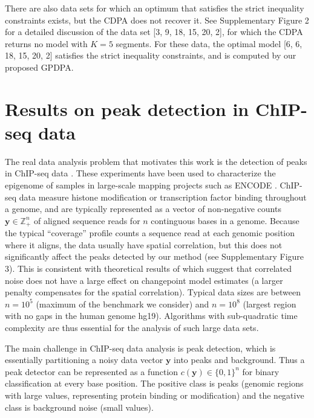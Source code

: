 \documentclass[twoside,11pt]{article}
\newcommand{\ZZ}{\mathbb Z}
\begin{document}
There are also data sets for which an optimum that satisfies the
strict inequality constraints exists, but the CDPA does not recover
it. See Supplementary Figure 2 for a detailed discussion of the data
set [3, 9, 18, 15, 20, 2], for which the CDPA returns no model with
$K=5$ segments. For these data, the optimal model [6, 6, 18, 15, 20,
2] satisfies the strict inequality constraints, and is computed by our
proposed GPDPA.

\section{Results on peak detection in ChIP-seq data}
\label{sec:results-chip-seq}
\label{sec:results}



The real data analysis problem that motivates this work is the
detection of peaks in ChIP-seq data \citep{practical}. These
experiments have been used to characterize the epigenome of samples in
large-scale mapping projects such as ENCODE \citep{ENCODE}. ChIP-seq
data measure histone modification or transcription factor binding
throughout a genome, and are typically represented as a vector of
non-negative counts $\mathbf y\in\ZZ_+^n$ of aligned sequence reads
for $n$ continguous bases in a genome. Because the typical
``coverage'' profile counts a sequence read at each genomic position
where it aligns, the data usually have spatial correlation, but this
does not significantly affect the peaks detected by our method (see
Supplementary Figure 3). This is consistent with theoretical results
of \citet{Lavielle-Moulines} which suggest that correlated noise does
not have a large effect on changepoint model estimates (a larger
penalty compensates for the spatial correlation). Typical data sizes are
between $n=10^5$ (maximum of the benchmark we consider) and $n=10^8$
(largest region with no gaps in the human genome hg19). Algorithms
with sub-quadratic time complexity are thus essential for the analysis
of such large data sets.

The main challenge in ChIP-seq data analysis is peak detection, which
is essentially partitioning a noisy data vector $\mathbf y$ into peaks and
background. Thus a peak detector can be represented as a function
$c(\mathbf y)\in\{0,1\}^n$ for binary classification at every base
position. The positive class is peaks (genomic regions with large
values, representing protein binding or modification) and the negative
class is background noise (small values).
\end{document}
